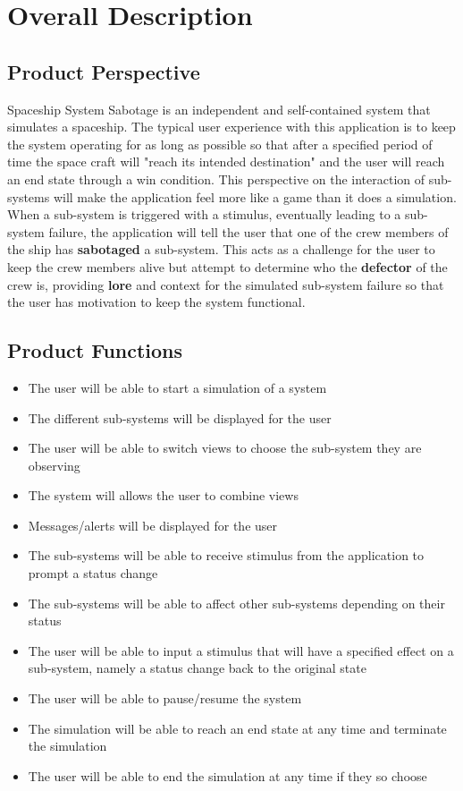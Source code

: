 \documentclass[12pt, titlepage]{article}
\newcommand\tab[1][1cm]{\hspace*{#1}}
\begin{document}

\section{Overall Description}
\subsection{Product Perspective}
\tab Spaceship System Sabotage is an independent and self-contained system that simulates a spaceship. The typical user experience with this application is to keep the system operating for as long as possible so that after a specified period of time the space craft will "reach its intended destination" and the user will reach an end state through a win condition. This perspective on the interaction of sub-systems will make the application feel more like a game than it does a simulation. When a sub-system is triggered with a stimulus, eventually leading to a sub-system failure, the application will tell the user that one of the crew members of the ship has  \textbf{sabotaged} a sub-system. This acts as a challenge for the user to keep the crew members alive but attempt to determine who the \textbf{defector} of the crew is, providing  \textbf{lore} and context for the simulated sub-system failure so that the user has motivation to keep the system functional.

\subsection{Product Functions}
\begin{itemize}
\item The user will be able to start a simulation of a system
\item The different sub-systems will be displayed for the user
\item The user will be able to switch views to choose the sub-system they are observing
\item The system will allows the user to combine views
\item Messages/alerts will be displayed for the user
\item The sub-systems will be able to receive stimulus from the application to prompt a status change
\item The sub-systems will be able to affect other sub-systems depending on their status
\item The user will be able to input a stimulus that will have a specified effect on a sub-system, namely a status change back to the original state
\item The user will be able to pause/resume the system
\item The simulation will be able to reach an end state at any time and terminate the simulation
\item The user will be able to end the simulation at any time if they so choose
\end{itemize}
\end{document}
